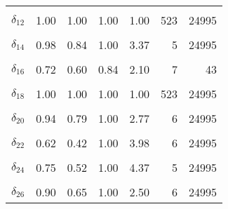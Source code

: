 \begin{table}
\begin{tabular}[t]{lrrrrrr}
\cellcolor{gray!6}{$\delta_{11}$} & \cellcolor{gray!6}{0.64} & \cellcolor{gray!6}{0.42} & \cellcolor{gray!6}{0.84} & \cellcolor{gray!6}{2.58} & \cellcolor{gray!6}{8} & \cellcolor{gray!6}{6}\\
$\delta_{12}$ & 1.00 & 1.00 & 1.00 & 1.00 & 523 & 24995\\
\cellcolor{gray!6}{$\delta_{13}$} & \cellcolor{gray!6}{1.00} & \cellcolor{gray!6}{1.00} & \cellcolor{gray!6}{1.00} & \cellcolor{gray!6}{1.00} & \cellcolor{gray!6}{523} & \cellcolor{gray!6}{24995}\\
$\delta_{14}$ & 0.98 & 0.84 & 1.00 & 3.37 & 5 & 24995\\
\cellcolor{gray!6}{$\delta_{15}$} & \cellcolor{gray!6}{1.00} & \cellcolor{gray!6}{1.00} & \cellcolor{gray!6}{1.00} & \cellcolor{gray!6}{1.00} & \cellcolor{gray!6}{523} & \cellcolor{gray!6}{24995}\\
$\delta_{16}$ & 0.72 & 0.60 & 0.84 & 2.10 & 7 & 43\\
\cellcolor{gray!6}{$\delta_{17}$} & \cellcolor{gray!6}{0.69} & \cellcolor{gray!6}{0.59} & \cellcolor{gray!6}{0.74} & \cellcolor{gray!6}{2.23} & \cellcolor{gray!6}{6} & \cellcolor{gray!6}{5}\\
$\delta_{18}$ & 1.00 & 1.00 & 1.00 & 1.00 & 523 & 24995\\
\cellcolor{gray!6}{$\delta_{19}$} & \cellcolor{gray!6}{1.00} & \cellcolor{gray!6}{0.98} & \cellcolor{gray!6}{1.00} & \cellcolor{gray!6}{2.08} & \cellcolor{gray!6}{7} & \cellcolor{gray!6}{24995}\\
$\delta_{20}$ & 0.94 & 0.79 & 1.00 & 2.77 & 6 & 24995\\
\cellcolor{gray!6}{$\delta_{21}$} & \cellcolor{gray!6}{0.82} & \cellcolor{gray!6}{0.57} & \cellcolor{gray!6}{1.00} & \cellcolor{gray!6}{3.94} & \cellcolor{gray!6}{6} & \cellcolor{gray!6}{24995}\\
$\delta_{22}$ & 0.62 & 0.42 & 1.00 & 3.98 & 6 & 24995\\
\cellcolor{gray!6}{$\delta_{23}$} & \cellcolor{gray!6}{0.86} & \cellcolor{gray!6}{0.73} & \cellcolor{gray!6}{1.00} & \cellcolor{gray!6}{3.05} & \cellcolor{gray!6}{6} & \cellcolor{gray!6}{24995}\\
$\delta_{24}$ & 0.75 & 0.52 & 1.00 & 4.37 & 5 & 24995\\
\cellcolor{gray!6}{$\delta_{25}$} & \cellcolor{gray!6}{0.81} & \cellcolor{gray!6}{0.62} & \cellcolor{gray!6}{1.00} & \cellcolor{gray!6}{2.07} & \cellcolor{gray!6}{7} & \cellcolor{gray!6}{24995}\\
$\delta_{26}$ & 0.90 & 0.65 & 1.00 & 2.50 & 6 & 24995\\

\end{tabular}
\end{table}
